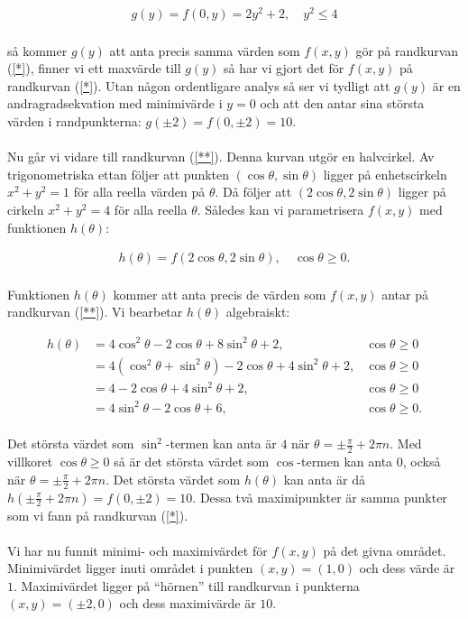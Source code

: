 \documentclass{article}
\begin{document}
\begin{gather*}
  g(y) = f(0, y) = 2y^{2} + 2, \quad y^{2} \leq 4
\end{gather*}
\\
så kommer $g(y)$ att anta precis samma värden som $f(x, y)$ gör på randkurvan (\ref{*}), finner vi ett maxvärde till $g(y)$ så har vi gjort det för $f(x, y)$ på randkurvan (\ref{*}). Utan någon ordentligare analys så ser vi tydligt att $g(y)$ är en andragradsekvation med minimivärde i $y = 0$ och att den antar sina största värden i randpunkterna: $g(\pm2) = f(0, \pm2) = 10$.
\\
\\
Nu går vi vidare till randkurvan (\ref{**}). Denna kurvan utgör en halvcirkel. Av trigonometriska ettan följer att punkten $(\cos\theta, \sin\theta)$ ligger på enhetscirkeln $x^{2} + y^{2} = 1$ för alla reella värden på $\theta$. Då följer att $(2\cos\theta, 2\sin\theta)$ ligger på cirkeln $x^{2} + y^{2} = 4$ för alla reella $\theta$. Således kan vi parametrisera $f(x, y)$ med funktionen $h(\theta)$:

\begin{gather*}
  h(\theta) = f(2\cos\theta, 2\sin\theta), \quad \cos\theta \geq 0\text{.}
\end{gather*}
\\
Funktionen $h(\theta)$ kommer att anta precis de värden som $f(x, y)$ antar på randkurvan (\ref{**}). Vi bearbetar $h(\theta)$ algebraiskt:

\begin{align*}
  h(\theta) &= 4\cos^{2}\theta - 2\cos\theta + 8\sin^{2}\theta + 2, & \cos\theta \geq 0 \\
            &= 4(\cos^{2}\theta + \sin^{2}\theta) -2\cos\theta + 4\sin^{2}\theta + 2, & \cos\theta \geq 0 \\
            &= 4 - 2\cos\theta + 4\sin^{2}\theta + 2, & \cos\theta \geq 0\\
            &= 4\sin^{2}\theta - 2\cos\theta + 6, & \cos\theta \geq 0\text{.}
\end{align*}
\\
Det största värdet som $\sin^{2}$-termen kan anta är $4$ när $\theta = \pm\tfrac{\pi}{2} + 2\pi n$. Med villkoret $\cos\theta \geq 0$ så är det största värdet som $\cos$-termen kan anta $0$, också när $\theta = \pm\tfrac{\pi}{2} + 2\pi n$. Det största värdet som $h(\theta)$ kan anta är då $h(\pm\tfrac{\pi}{2} + 2\pi n) = f(0, \pm2) = 10$. Dessa två maximipunkter är samma punkter som vi fann på randkurvan (\ref{*}).
\\
\\
Vi har nu funnit minimi- och maximivärdet för $f(x, y)$ på det givna området. Minimivärdet ligger inuti området i punkten $(x, y) = (1, 0)$ och dess värde är $1$. Maximivärdet ligger på ``hörnen'' till randkurvan i punkterna $(x, y) = (\pm 2, 0)$ och dess maximivärde är $10$.
\end{document}
